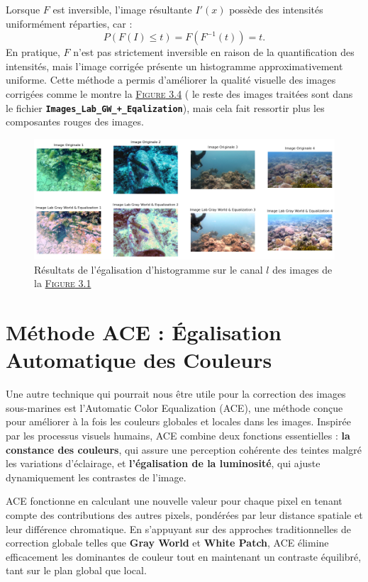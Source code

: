 \documentclass[10pt, a4paper]{extarticle}
\numberwithin{equation}{section}
\numberwithin{figure}{section}
\begin{document}
Lorsque \( F \) est inversible, l'image résultante \( I'(x) \) possède des intensités uniformément réparties, car :
\[
P(F(I) \leq t) = F(F^{-1}(t)) = t.
\]
En pratique, \( F \) n'est pas strictement inversible en raison de la quantification des intensités, mais l'image corrigée présente un histogramme approximativement uniforme. Cette méthode a permis d'améliorer la qualité visuelle des images corrigées comme le montre la \hyperref[figure3.4]{\textsc{Figure} 3.4} ( le reste des images traitées sont dans le fichier \colorbox{gray!15}{\texttt{\textbf{Images\_Lab\_GW\_+\_Eqalization}}}), mais cela fait ressortir plus les composantes rouges des images.

\begin{figure}[h!]
\begin{center}
\includegraphics[width=18cm]{image009.png}
\end{center}
\label{figure3.4}
\caption{Résultats de l'égalisation d'histogramme sur le canal $l$ des images de la \hyperref[figure3.1]{\textsc{Figure} 3.1}}
\end{figure} 

\section{Méthode ACE : Égalisation Automatique des Couleurs}
\par Une autre technique qui pourrait nous être utile pour la correction des images sous-marines est l'Automatic Color Equalization (ACE), une méthode conçue pour améliorer à la fois les couleurs globales et locales dans les images. Inspirée par les processus visuels humains, ACE combine deux fonctions essentielles : \textbf{la constance des couleurs}, qui assure une perception cohérente des teintes malgré les variations d'éclairage, et \textbf{l'égalisation de la luminosité}, qui ajuste dynamiquement les contrastes de l'image.
\vspace{2mm}
\par ACE fonctionne en calculant une nouvelle valeur pour chaque pixel en tenant compte des contributions des autres pixels, pondérées par leur distance spatiale et leur différence chromatique. En s'appuyant sur des approches traditionnelles de correction globale telles que \textbf{Gray World} et \textbf{White Patch}, ACE élimine efficacement les dominantes de couleur tout en maintenant un contraste équilibré, tant sur le plan global que local.
\end{document}

